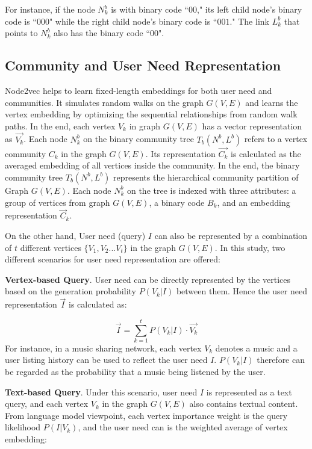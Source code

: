 For instance, if the node \textit{$N_{k}^{b}$} is with binary code ``$00$," its left child node's binary code is ``$000$" while the right child node's binary code is ``$001$." The link \textit{$L_{k}^{b}$} that points to \textit{$N_{k}^{b}$} also has the binary code ``$00$". 

\subsection{Community and User Need Representation} \label{sc:c3_representation}

Node2vec \cite{grover2016node2vec} helps to learn fixed-length embeddings for both user need and communities. It simulates random walks on the graph $G(V,E)$ and learns the vertex embedding by optimizing the sequential relationships from random walk paths. In the end, each vertex $V_{k}$ in graph $G(V,E)$ has a vector representation as $\vec{V_k}$. Each node $N_{k}^{b}$ on the binary community tree \textit{$T_{b}(N^{b},L^{b})$} refers to a vertex community $C_{k}$ in the graph $G(V,E)$. Its representation $\vec{C_{k}}$ is calculated as the averaged embedding of all vertices inside the community. In the end, the binary community tree \textit{$T_{b}(N^{b},L^{b})$} represents the hierarchical community partition of Graph $G(V,E)$. Each node \textit{$N_{k}^{b}$} on the tree is indexed with three attributes: a group of vertices from graph $G(V,E)$, a binary code \textit{$B_{k}$}, and an embedding representation \textit{$\vec{C}_{k}$}.

On the other hand, User need (query) $I$ can also be represented by a combination of $t$ different vertices $\{V_1, V_2... V_t\}$ in the graph $G(V,E)$. In this study, two different scenarios for user need representation are offered:

\textbf{Vertex-based Query}. User need can be directly represented by the vertices based on the generation probability $P(V_k|I)$ between them. Hence the user need representation $\vec{I}$ is calculated as:

\begin{equation}
\vec{I} = \sum_{k=1}^{t} P(V_k|I) \cdot \vec{V_k} 
\end{equation} 
For instance, in a music sharing network, each vertex $V_k$ denotes a music and a user listing history can be used to reflect the user need $I$. $P(V_k|I)$ therefore can be regarded as the probability that a music being listened by the user. 

\textbf{Text-based Query}. Under this scenario, user need $I$ is represented as a text query, and each vertex $V_{k}$ in the graph $G(V,E)$ also contains textual content. From language model viewpoint, each vertex importance weight is the query likelihood $P(I|V_k)$, and the user need can is the weighted average of vertex embedding: 

